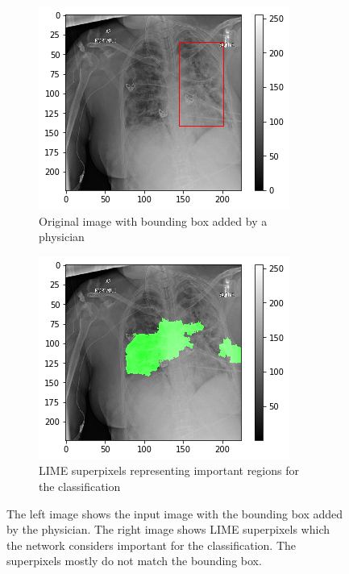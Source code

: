 \begin{figure}[H]
    \centering
    \begin{subfigure}[t]{.45\textwidth}
        \centering
        \includegraphics[width=\linewidth]{chapters/03_classification/images/rise2_bbox.png}
        \caption{Original image with bounding box added by a physician}
    \end{subfigure}\hspace{1cm}%
    \begin{subfigure}[t]{.45\textwidth}
        \centering
        \includegraphics[width=\linewidth]{chapters/03_classification/images/lime_8.png}
        \caption{LIME superpixels representing important regions for the classification}
    \end{subfigure}
    \caption{The left image shows the input image with the bounding box added by the physician.  The right image  shows  LIME  superpixels  which  the  network considers  important  for  the  classification. The superpixels mostly do not match the bounding box.}
    \label{lime_example_3}
\end{figure}

